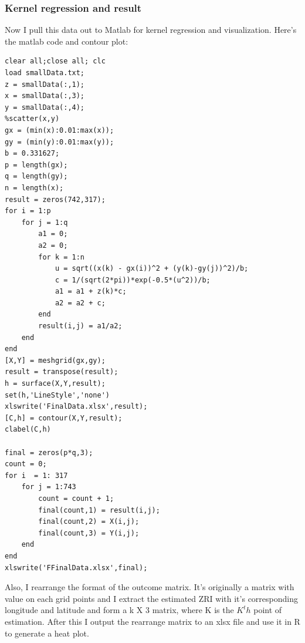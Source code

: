 \documentclass[a4paper]{article}
\begin{document}
\subsubsection{Kernel regression and result}
Now I pull this data out to Matlab for kernel regression and visualization. Here's the matlab code and contour plot:\\

\begin{lstlisting}
clear all;close all; clc
load smallData.txt;
z = smallData(:,1);
x = smallData(:,3);
y = smallData(:,4);
%scatter(x,y)
gx = (min(x):0.01:max(x));
gy = (min(y):0.01:max(y));
b = 0.331627;
p = length(gx);
q = length(gy);
n = length(x);
result = zeros(742,317);
for i = 1:p
    for j = 1:q
        a1 = 0;
        a2 = 0;
        for k = 1:n
            u = sqrt((x(k) - gx(i))^2 + (y(k)-gy(j))^2)/b;
            c = 1/(sqrt(2*pi))*exp(-0.5*(u^2))/b;
            a1 = a1 + z(k)*c;
            a2 = a2 + c;
        end
        result(i,j) = a1/a2;
    end
end
[X,Y] = meshgrid(gx,gy);
result = transpose(result);
h = surface(X,Y,result);
set(h,'LineStyle','none')
xlswrite('FinalData.xlsx',result);
[C,h] = contour(X,Y,result);   
clabel(C,h)

final = zeros(p*q,3);
count = 0;
for i  = 1: 317
    for j = 1:743
        count = count + 1;
        final(count,1) = result(i,j);
        final(count,2) = X(i,j);
        final(count,3) = Y(i,j);
    end
end
xlswrite('FFinalData.xlsx',final);
\end{lstlisting}

Also, I rearrange the format of the outcome matrix. It's originally a matrix with value on each grid points and I extract the estimated ZRI with it's corresponding longitude and latitude and form a k X 3 matrix, where K is the $K^th$ point of estimation. After this I output the rearrange matrix to an xlsx file and use it in R to generate a heat plot.
\end{document}
